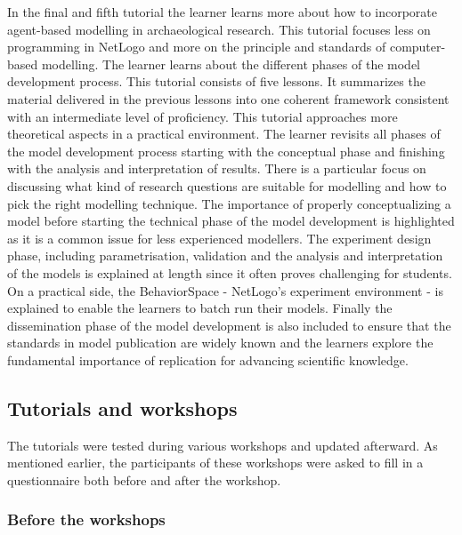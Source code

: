 \documentclass[
]{article}
\begin{document}
In the final and fifth tutorial the learner learns more about how to incorporate agent-based modelling in archaeological research. This tutorial focuses less on programming in NetLogo and more on the principle and standards of computer-based modelling. The learner learns about the different phases of the model development process. This tutorial consists of five lessons. It summarizes the material delivered in the previous lessons into one coherent framework consistent with an intermediate level of proficiency. This tutorial approaches more theoretical aspects in a practical environment. The learner revisits all phases of the model development process starting with the conceptual phase and finishing with the analysis and interpretation of results. There is a particular focus on discussing what kind of research questions are suitable for modelling and how to pick the right modelling technique. The importance of properly conceptualizing a model before starting the technical phase of the model development is highlighted as it is a common issue for less experienced modellers. The experiment design phase, including parametrisation, validation and the analysis and interpretation of the models is explained at length since it often proves challenging for students. On a practical side, the BehaviorSpace - NetLogo's experiment environment - is explained to enable the learners to batch run their models. Finally the dissemination phase of the model development is also included to ensure that the standards in model publication are widely known and the learners explore the fundamental importance of replication for advancing scientific knowledge.

\hypertarget{tutorials-and-workshops}{%
\subsection{Tutorials and workshops}\label{tutorials-and-workshops}}

The tutorials were tested during various workshops and updated afterward. As mentioned earlier, the participants of these workshops were asked to fill in a questionnaire both before and after the workshop.

\hypertarget{before-the-workshops}{%
\subsubsection{Before the workshops}\label{before-the-workshops}}
\end{document}
